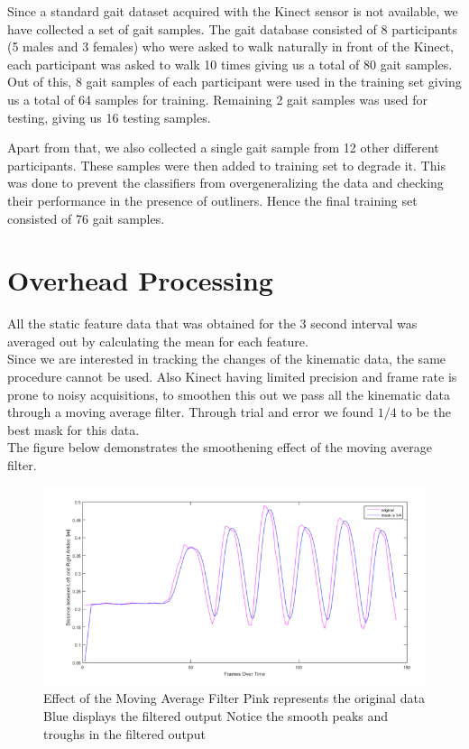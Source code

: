 \noindent Since a standard gait dataset acquired with the Kinect sensor is not available, we have collected a set of gait samples. The gait database consisted of 8 participants (5 males and 3 females) who were asked to walk naturally in front of the Kinect, each participant was asked to walk 10 times giving us a total of 80 gait samples. Out of this, 8 gait samples of each participant were used in the training set giving us a total of 64 samples for training. Remaining 2 gait samples was used for testing, giving us 16 testing samples.

Apart from that, we also collected a single gait sample from 12 other different participants. These samples were then added to training set to degrade it. This was done to prevent the classifiers from overgeneralizing the data and checking their performance in the presence of outliners. Hence the final training set consisted of 76 gait samples.

\newpage
\section{Overhead Processing} \label{Overhead Processing} 
\noindent All the static feature data that was obtained for the 3 second interval was averaged out by calculating the mean for each feature.\\                                                                                                                                                                                                               Since we are interested in tracking the changes of the kinematic data, the same procedure cannot be used. Also Kinect having limited precision and frame rate is prone to noisy acquisitions, to smoothen this out we pass all the kinematic data through a moving average filter. Through trial and error we found $1/4$ to be the best mask for this data.\\
The figure below demonstrates the smoothening effect of the moving average filter.

\begin{figure}[h]
\centering
\includegraphics[scale=0.7]{filter.png}
\caption{Effect of the Moving Average Filter Pink represents the original data Blue displays the filtered output Notice the smooth peaks and troughs in the filtered output
}
\end{figure}
\newpage
